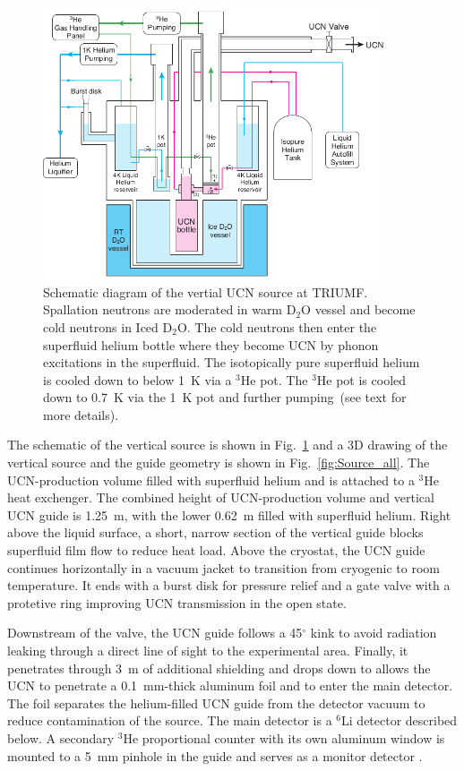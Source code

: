 \begin{figure}[h!]
  \centering
  \includegraphics[width=0.9\textwidth]{vertical_source.png}
  \caption{Schematic diagram of the vertial UCN source at
    TRIUMF. Spallation neutrons are moderated in warm D$_2$O vessel
    and become cold neutrons in Iced D$_2$O. The cold neutrons then
    enter the superfluid helium bottle where they become UCN by phonon
    excitations in the superfluid. The isotopically pure superfluid
    helium is cooled down to below 1~K via a $^3$He pot. The $^3$He
    pot is cooled down to 0.7~K via the 1~K pot and further
    pumping~(see text for more details). }
  \label{fig:source}
\end{figure}



The schematic of the vertical source is shown in Fig.~\ref{fig:source}
and a 3D drawing of the vertical source and the guide geometry is
shown in Fig.~\ref{fig:Source_all}. The UCN-production volume filled
with superfluid helium and is attached to a $^3$He heat exchenger. The
combined height of UCN-production volume and vertical UCN guide is
1.25~m, with the lower 0.62~m filled with superfluid helium. Right
above the liquid surface, a short, narrow section of the vertical
guide blocks superfluid film flow to reduce heat load. Above the
cryostat, the UCN guide continues horizontally in a vacuum jacket to
transition from cryogenic to room temperature. It ends with a burst
disk for pressure relief and a gate valve with a protetive ring
improving UCN transmission in the open state.

Downstream of the valve, the UCN guide follows a 45$^\circ$ kink to
avoid radiation leaking through a direct line of sight to the
experimental area. Finally, it penetrates through 3~m of additional
shielding and drops down to allows the UCN to penetrate a 0.1~mm-thick
aluminum foil and to enter the main detector. The foil separates the
helium-filled UCN guide from the detector vacuum to reduce
contamination of the source. The main detector is a $^6$Li detector
described below. A secondary $^3$He proportional counter with its own
aluminum window is mounted to a 5~mm pinhole in the guide and serves
as a monitor detector .




